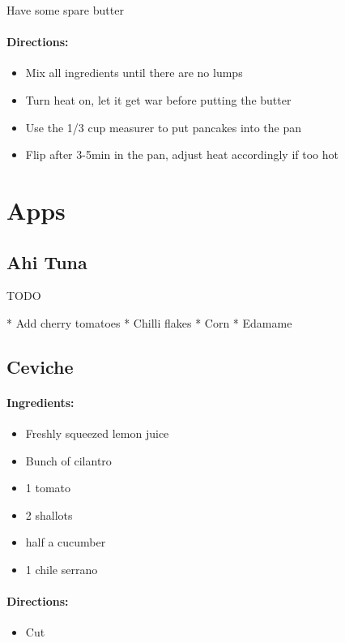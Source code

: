 \documentclass{article}
\begin{document}
Have some spare butter

\paragraph{Directions:}
\begin{itemize}
	\item Mix all ingredients until there are no lumps 
	\item Turn heat on, let it get war before putting the butter 
	\item Use the 1/3 cup measurer to put pancakes into the pan 
	\item Flip after 3-5min in the pan, adjust heat accordingly if too hot
\end{itemize}

\section{Apps}

\subsection{Ahi Tuna}

TODO

* Add cherry tomatoes
* Chilli flakes
* Corn
* Edamame

\subsection{Ceviche}

\paragraph{Ingredients:}

\begin{itemize}
	\item Freshly squeezed lemon juice
	\item Bunch of cilantro
	\item 1 tomato
	\item 2 shallots
	\item half a cucumber
	\item 1 chile serrano 
\end{itemize}

\paragraph{Directions:}
\begin{itemize}
	\item Cut
\end{itemize}
\end{document}
